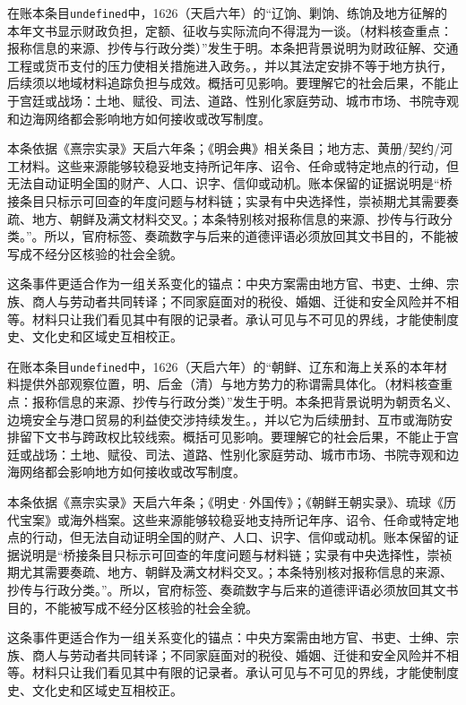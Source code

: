 在账本条目\texttt{undefined}中，1626（天启六年）的“辽饷、剿饷、练饷及地方征解的本年文书显示财政负担，定额、征收与实际流向不得混为一谈。（材料核查重点：报称信息的来源、抄传与行政分类）”发生于明。本条把背景说明为财政征解、交通工程或货币支付的压力使相关措施进入政务。，并以其法定安排不等于地方执行，后续须以地域材料追踪负担与成效。概括可见影响。要理解它的社会后果，不能止于宫廷或战场：土地、赋役、司法、道路、性别化家庭劳动、城市市场、书院寺观和边海网络都会影响地方如何接收或改写制度。

本条依据《熹宗实录》天启六年条；《明会典》相关条目；地方志、黄册/契约/河工材料。这些来源能够较稳妥地支持所记年序、诏令、任命或特定地点的行动，但无法自动证明全国的财产、人口、识字、信仰或动机。账本保留的证据说明是“桥接条目只标示可回查的年度问题与材料链；实录有中央选择性，崇祯期尤其需要奏疏、地方、朝鲜及满文材料交叉。；本条特别核对报称信息的来源、抄传与行政分类。”。所以，官府标签、奏疏数字与后来的道德评语必须放回其文书目的，不能被写成不经分区核验的社会全貌。

这条事件更适合作为一组关系变化的锚点：中央方案需由地方官、书吏、士绅、宗族、商人与劳动者共同转译；不同家庭面对的税役、婚姻、迁徙和安全风险并不相等。材料只让我们看见其中有限的记录者。承认可见与不可见的界线，才能使制度史、文化史和区域史互相校正。

在账本条目\texttt{undefined}中，1626（天启六年）的“朝鲜、辽东和海上关系的本年材料提供外部观察位置，明、后金（清）与地方势力的称谓需具体化。（材料核查重点：报称信息的来源、抄传与行政分类）”发生于明。本条把背景说明为朝贡名义、边境安全与港口贸易的利益使交涉持续发生。，并以它为后续册封、互市或海防安排留下文书与跨政权比较线索。概括可见影响。要理解它的社会后果，不能止于宫廷或战场：土地、赋役、司法、道路、性别化家庭劳动、城市市场、书院寺观和边海网络都会影响地方如何接收或改写制度。

本条依据《熹宗实录》天启六年条；《明史·外国传》；《朝鲜王朝实录》、琉球《历代宝案》或海外档案。这些来源能够较稳妥地支持所记年序、诏令、任命或特定地点的行动，但无法自动证明全国的财产、人口、识字、信仰或动机。账本保留的证据说明是“桥接条目只标示可回查的年度问题与材料链；实录有中央选择性，崇祯期尤其需要奏疏、地方、朝鲜及满文材料交叉。；本条特别核对报称信息的来源、抄传与行政分类。”。所以，官府标签、奏疏数字与后来的道德评语必须放回其文书目的，不能被写成不经分区核验的社会全貌。

这条事件更适合作为一组关系变化的锚点：中央方案需由地方官、书吏、士绅、宗族、商人与劳动者共同转译；不同家庭面对的税役、婚姻、迁徙和安全风险并不相等。材料只让我们看见其中有限的记录者。承认可见与不可见的界线，才能使制度史、文化史和区域史互相校正。

